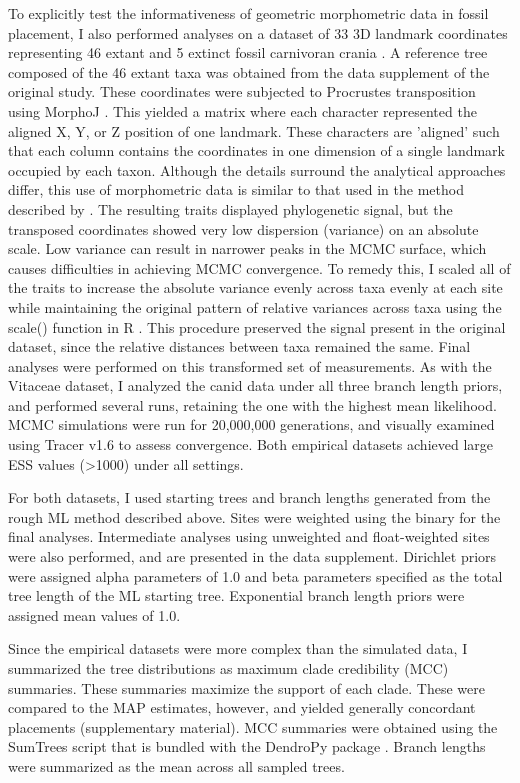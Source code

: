 \documentclass[12pt]{article}
\begin{document}
To explicitly test the informativeness of geometric morphometric data in
fossil placement, I also performed analyses on a dataset of 33 3D landmark
coordinates representing 46 extant and 5 extinct fossil carnivoran
crania \citep{jones2015impact}. A reference tree composed of the 46 extant
taxa was obtained from the data supplement of the original study. These
coordinates were subjected to Procrustes transposition using MorphoJ \citep{klingenberg2011morphoj}.
This yielded a matrix where each character represented the aligned  X, Y, or Z position of one landmark. These
characters are 'aligned' such that each column contains the coordinates in one dimension of a single landmark
occupied by each taxon.  Although the details surround the analytical approaches differ, 
this use of morphometric data is similar to that used in the method described by
\cite{catalano2010phylogenetic}.
The resulting traits displayed phylogenetic signal, but the transposed
coordinates showed very low dispersion (variance) on an absolute scale.
Low variance can result in narrower peaks in the MCMC surface, which causes difficulties in
achieving MCMC convergence. To remedy this, I scaled all of the traits
to increase the absolute variance evenly across taxa evenly at each site while
maintaining the original pattern of relative variances across taxa using the scale() function in R \citep{R}. This
procedure preserved the signal present in the original dataset, since the
relative distances between taxa remained the same. Final analyses were
performed on this transformed set of measurements. As with the
Vitaceae dataset, I analyzed the canid data under all three branch
length priors, and performed several runs, retaining the one with the 
highest mean likelihood.
 MCMC simulations were run for 20,000,000 generations, and
visually examined using Tracer v1.6 to assess convergence. Both
empirical datasets achieved large ESS values (>1000) under all settings. 

For both datasets, I used starting trees and branch lengths generated
from the rough ML method described above. Sites were weighted using the
binary for the final analyses. Intermediate analyses using unweighted
and float-weighted sites were also performed, and are presented in the
data supplement. Dirichlet priors were assigned alpha parameters of 1.0
and beta parameters specified as the total tree length of the ML
starting tree. Exponential branch length priors were assigned mean
values of 1.0.

Since the empirical datasets were more complex than the simulated data,
I summarized the tree distributions as maximum clade credibility (MCC)
summaries. These summaries maximize the support of each clade. These
were compared to the MAP estimates, however, and yielded generally
concordant placements (supplementary material). MCC summaries were
obtained using the SumTrees script that is bundled with the DendroPy
package \citep{sukumaran2010dendropy}. Branch lengths were summarized as
the mean across all sampled trees.
\end{document}
